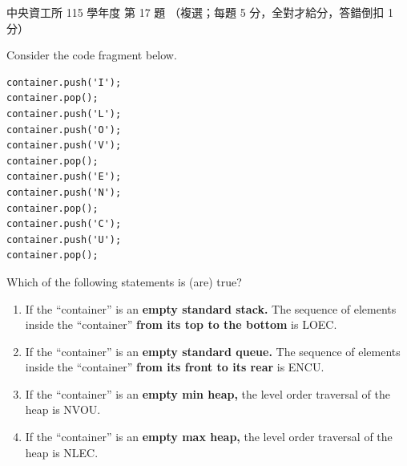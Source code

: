 \begin{pastexam}[label={px:ncu-115-dsa-17}]{中央資工所 115 學年度 第 17 題}
（複選；每題 5 分，全對才給分，答錯倒扣 1 分）

Consider the code fragment below.
\begin{center}
\begin{minipage}{5cm}
\begin{verbatim}
container.push('I');
container.pop();
container.push('L');
container.push('O');
container.push('V');
container.pop();
container.push('E');
container.push('N');
container.pop();
container.push('C');
container.push('U');
container.pop();
\end{verbatim}
\end{minipage}
\end{center}
Which of the following statements is (are) true?
\begin{enumerate}[label=\Alph*.]
\item If the ``container'' is an \textbf{empty standard stack.} The sequence of elements inside the ``container'' \textbf{from its top to the bottom} is LOEC.
\item If the ``container'' is an \textbf{empty standard queue.} The sequence of elements inside the ``container'' \textbf{from its front to its rear} is ENCU.
\item If the ``container'' is an \textbf{empty min heap,} the level order traversal of the heap is NVOU.
\item If the ``container'' is an \textbf{empty max heap,} the level order traversal of the heap is NLEC.
\end{enumerate}
\end{pastexam}

